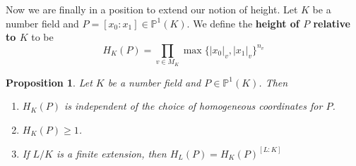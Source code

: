 \documentclass[12pt]{amsart}
\newtheorem{prop}[thm]{Proposition}
\theoremstyle{definition}
\theoremstyle{remark}
\theoremstyle{definition}
\renewcommand{\P}{\mathbb{P}}
\begin{document}
Now we are finally in a position to extend our notion of height. Let $K$ be a number field and $P = [x_0:x_1] \in \P^1(K)$. We define the \textbf{height of $P$ relative to $K$} to be $$H_K(P) = \prod_{v \in M_K}\max\{|x_0|_{v}, |x_1|_{v}\}^{n_{v}}$$

\begin{prop}
Let $K$ be a number field and $P \in \P^1(K)$. Then 

\begin{enumerate}
\item $H_K(P)$ is independent of the choice of homogeneous coordinates for $P$. 

\item $H_K(P) \geq 1$.

\item If $L/K$ is a finite extension, then $H_L(P) = H_K(P)^{[L:K]}$

\end{enumerate}
\end{prop}
\end{document}
